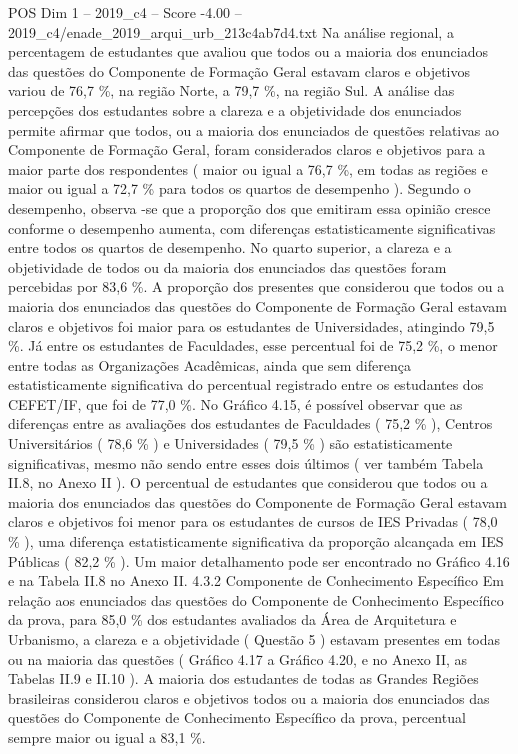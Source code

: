 \begin{textsample}{POS Dim 1 – 2019\_c4 – Score -4.00 – 2019\_c4/enade\_2019\_arqui\_urb\_213c4ab7d4.txt}
Na análise regional, a percentagem de estudantes que avaliou que todos ou a maioria dos enunciados das questões do Componente de Formação Geral estavam claros e objetivos variou de 76,7 \%, na região Norte, a 79,7 \%, na região Sul.
A análise das percepções dos estudantes sobre a clareza e a objetividade dos enunciados permite afirmar que todos, ou a maioria dos enunciados de questões relativas ao Componente de Formação Geral, foram considerados claros e objetivos para a maior parte dos respondentes ( maior ou igual a 76,7 \%, em todas as regiões e maior ou igual a 72,7 \% para todos os quartos de desempenho ).
Segundo o desempenho, observa -se que a proporção dos que emitiram essa opinião cresce conforme o desempenho aumenta, com diferenças estatisticamente significativas entre todos os quartos de desempenho.
No quarto superior, a clareza e a objetividade de todos ou da maioria dos enunciados das questões foram percebidas por 83,6 \%.
A proporção dos presentes que considerou que todos ou a maioria dos enunciados das questões do Componente de Formação Geral estavam claros e objetivos foi maior para os estudantes de Universidades, atingindo 79,5 \%.
Já entre os estudantes de Faculdades, esse percentual foi de 75,2 \%, o menor entre todas as Organizações Acadêmicas, ainda que sem diferença estatisticamente significativa do percentual registrado entre os estudantes dos CEFET/IF, que foi de 77,0 \%.
No Gráfico 4.15, é possível observar que as diferenças entre as avaliações dos estudantes de Faculdades ( 75,2 \% ), Centros Universitários ( 78,6 \% ) e Universidades ( 79,5 \% ) são estatisticamente significativas, mesmo não sendo entre esses dois últimos ( ver também Tabela II.8, no Anexo II ).
O percentual de estudantes que considerou que todos ou a maioria dos enunciados das questões do Componente de Formação Geral estavam claros e objetivos foi menor para os estudantes de cursos de IES Privadas ( 78,0 \% ), uma diferença estatisticamente significativa da proporção alcançada em IES Públicas ( 82,2 \% ).
Um maior detalhamento pode ser encontrado no Gráfico 4.16 e na Tabela II.8 no Anexo II. 4.3.2 Componente de Conhecimento Específico Em relação aos enunciados das questões do Componente de Conhecimento Específico da prova, para 85,0 \% dos estudantes avaliados da Área de Arquitetura e Urbanismo, a clareza e a objetividade ( Questão 5 ) estavam presentes em todas ou na maioria das questões ( Gráfico 4.17 a Gráfico 4.20, e no Anexo II, as Tabelas II.9 e II.10 ).
A maioria dos estudantes de todas as Grandes Regiões brasileiras considerou claros e objetivos todos ou a maioria dos enunciados das questões do Componente de Conhecimento Específico da prova, percentual sempre maior ou igual a 83,1 \%.

\end{textsample}
